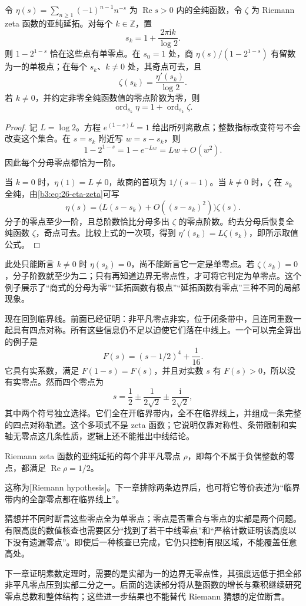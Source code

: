 \begin{proposition}[交错表示的表面奇点]\label{b3:prop:26-eta-apparent-singularities}
令 \(\eta(s)=\sum_{n\ge1}(-1)^{n-1}n^{-s}\) 为 \(\operatorname{Re}s>0\) 内的全纯函数，令 \(\zeta\) 为 Riemann zeta 函数的亚纯延拓。对每个 \(k\in\mathbb Z\)，置
\[
 s_k=1+\frac{2\pi\mathrm i k}{\log2}.
\]
则 \(1-2^{1-s}\) 恰在这些点有单零点。在 \(s_0=1\) 处，商 \(\eta(s)/(1-2^{1-s})\) 有留数为一的单极点；在每个 \(s_k\)、\(k\ne0\) 处，其奇点可去，且
\[
 \zeta(s_k)=\frac{\eta'(s_k)}{\log2}.
\]
若 \(k\ne0\)，并约定非零全纯函数值的零点阶数为零，则
\[
 \operatorname{ord}_{s_k}\eta
 =1+\operatorname{ord}_{s_k}\zeta.
\]
\end{proposition}
\begin{proof}
记 \(L=\log2\)。方程 \(e^{(1-s)L}=1\) 给出所列离散点；整数指标改变符号不会改变这个集合。在 \(s=s_k\) 附近写 \(w=s-s_k\)，则
\[
 1-2^{1-s}=1-e^{-Lw}=Lw+O(w^2).
\]
因此每个分母零点都恰为一阶。

当 \(k=0\) 时，\(\eta(1)=L\ne0\)，故商的首项为 \(1/(s-1)\)。当 \(k\ne0\) 时，\(\zeta\) 在 \(s_k\) 全纯，由\eqref{b3:eq:26-eta-zeta}可写
\[
 \eta(s)=\bigl(L(s-s_k)+O((s-s_k)^2)\bigr)\zeta(s).
\]
分子的零点至少一阶，且总阶数恰比分母多出 \(\zeta\) 的零点阶数。约去分母后恢复全纯函数 \(\zeta\)，奇点可去。比较上式的一次项，得到
\(\eta'(s_k)=L\zeta(s_k)\)，即所示取值公式。
\end{proof}

此处只能断言 \(k\ne0\) 时 \(\eta(s_k)=0\)，尚不能断言它一定是单零点。若 \(\zeta(s_k)=0\)，分子阶数就至少为二；只有再知道边界无零点性，才可将它判定为单零点。这个例子展示了“商式的分母为零”“延拓函数有极点”“延拓函数有零点”三种不同的局部现象。

现在回到临界线。前面已经证明：非平凡零点非实，位于闭条带中，且连同重数一起具有四点对称。所有这些信息仍不足以迫使它们落在中线上。一个可以完全算出的例子是
\[
 F(s)=(s-1/2)^4+\frac1{16}.
\]
它具有实系数，满足 \(F(1-s)=F(s)\)，并且对实数 \(s\) 有 \(F(s)>0\)，所以没有实零点。然而四个零点为
\[
 s=\frac12\pm\frac1{2\sqrt2}
       \pm\frac{\mathrm i}{2\sqrt2},
\]
其中两个符号独立选择。它们全在开临界带内，全不在临界线上，并组成一条完整的四点对称轨道。这个多项式不是 zeta 函数；它说明仅靠对称性、条带限制和实轴无零点这几条性质，逻辑上还不能推出中线结论。

\begin{conjecture}[Riemann]\label{b3:conj:26-rh}
Riemann zeta 函数的亚纯延拓的每个非平凡零点 \(\rho\)，即每个不属于负偶整数的零点，都满足 \(\operatorname{Re}\rho=1/2\)。
\end{conjecture}
这称为[Riemann hypothesis]。下一章排除两条边界后，也可将它等价表述为“临界带内的全部零点都在临界线上”。

猜想并不同时断言这些零点全为单零点；零点是否重合与零点的实部是两个问题。有限高度的数值核查也需要区分“找到了若干中线零点”和“严格计数证明该高度以下没有遗漏零点”。即使后一种核查已完成，它仍只控制有限区域，不能覆盖任意高处。

下一章证明素数定理时，需要的是实部为一的边界无零点性，其强度远低于把全部非平凡零点压到实部二分之一。后面的选读部分将从整函数的增长与乘积继续研究零点总数和整体结构；这些进一步结果也不能替代 Riemann 猜想的定位断言。
